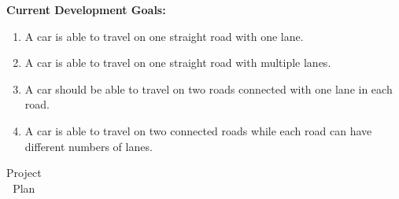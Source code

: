 \documentclass[a4paper,11pt]{article}
\begin{document}
\textbf{Current Development Goals:}
\begin{enumerate}
	\item A car is able to travel on one straight road with one lane.
	\item A car is able to travel on one straight road with multiple lanes.
	\item A car should be able to travel on two roads connected with one lane in each road.
	\item A car is able to travel on two connected roads while each road can have different numbers of lanes.
\end{enumerate}

\begin{table}[ht]
	\caption{Project Plan}
	\begin{adjustwidth}{-2cm}{}
	 \footnotesize
		
		\begin{tabular}{|m{0.8cm}|m{6cm}|m{2.3cm}|m{1.3cm}|m{1.3cm}|c|m{2.6cm}|m{0.5cm}|}\hline
			

\end{tabular}
\end{adjustwidth}
\end{table}
\end{document}
